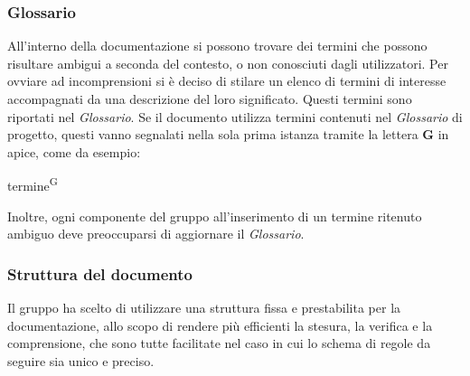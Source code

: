 \subsubsection{Glossario}
All’interno della documentazione si possono trovare dei termini che possono risultare ambigui a seconda del contesto, o non conosciuti dagli utilizzatori.
Per ovviare ad incomprensioni si è deciso di stilare un elenco di termini di interesse accompagnati da una descrizione del loro significato. Questi termini sono riportati nel \textit{Glossario}.
Se il documento utilizza termini contenuti nel \textit{Glossario} di progetto, questi vanno segnalati nella sola prima istanza tramite la lettera \textbf{G} in apice, come da esempio:
\begin{center}
    termine\textsuperscript{G}
\end{center}
Inoltre, ogni componente del gruppo all’inserimento di un termine ritenuto ambiguo deve preoccuparsi di aggiornare il \textit{Glossario}.
\subsubsection{Struttura del documento}
Il gruppo ha scelto di utilizzare una struttura fissa e prestabilita per la documentazione, allo scopo di rendere più efficienti la stesura, la verifica e la comprensione, che sono tutte facilitate nel caso in cui lo schema di regole da seguire sia unico e preciso.
